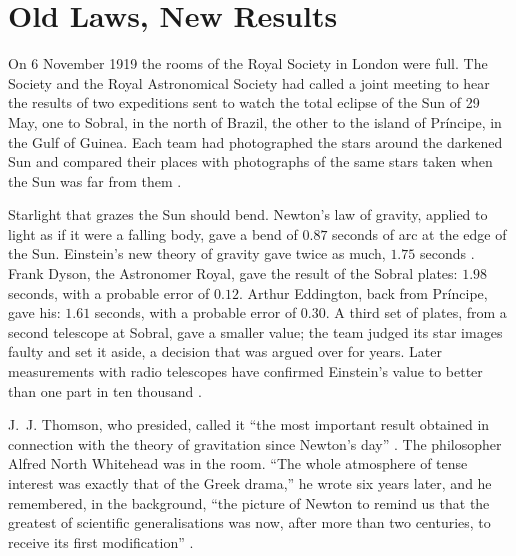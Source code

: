 \chapter{Old Laws, New Results}\label{ch:alignment}



On 6 November 1919 the rooms of the Royal Society in London were full. The Society and the Royal Astronomical Society had called a joint meeting to hear the results of two expeditions sent to watch the total eclipse of the Sun of 29 May, one to Sobral, in the north of Brazil, the other to the island of Pr{\'i}ncipe, in the Gulf of Guinea. Each team had photographed the stars around the darkened Sun and compared their places with photographs of the same stars taken when the Sun was far from them \citep{Dyson1920}.

Starlight that grazes the Sun should bend. Newton's law of gravity, applied to light as if it were a falling body, gave a bend of $0.87$ seconds of arc at the edge of the Sun. Einstein's new theory of gravity gave twice as much, $1.75$ seconds \citep{Einstein1916,Dyson1920}. Frank Dyson, the Astronomer Royal, gave the result of the Sobral plates: $1.98$ seconds, with a probable error of $0.12$. Arthur Eddington, back from Pr{\'i}ncipe, gave his: $1.61$ seconds, with a probable error of $0.30$. A third set of plates, from a second telescope at Sobral, gave a smaller value; the team judged its star images faulty and set it aside, a decision that was argued over for years. Later measurements with radio telescopes have confirmed Einstein's value to better than one part in ten thousand \citep{Will2014}.

J.~J. Thomson, who presided, called it \enquote{the most important result obtained in connection with the theory of gravitation since Newton's day} \citep{Observatory1919}. The philosopher Alfred North Whitehead was in the room. \enquote{The whole atmosphere of tense interest was exactly that of the Greek drama,} he wrote six years later, and he remembered, in the background, \enquote{the picture of Newton to remind us that the greatest of scientific generalisations was now, after more than two centuries, to receive its first modification} \citep{Whitehead1925}.

